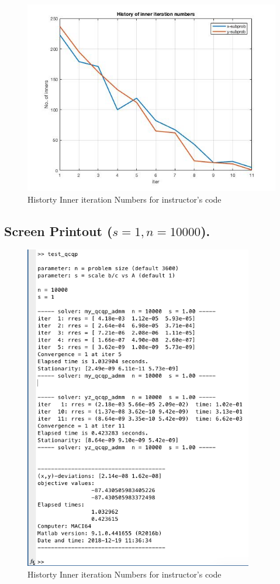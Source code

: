 \begin{figure}[H]
\centering
\includegraphics[width=12cm]{F_5/F_1_4.jpg}
\caption{Historty Inner iteration Numbers for instructor's code}
\end{figure}
\subsection{Screen Printout ($s=1,n=10000$).}
\begin{figure}[H]
\centering
\includegraphics[width=10cm]{F_5/F_1_1.png}
\caption{Historty Inner iteration Numbers for instructor's code}
\end{figure}



